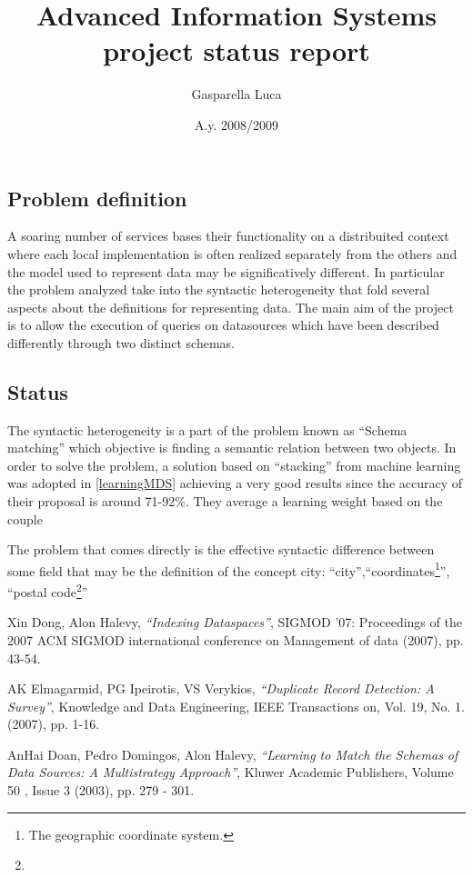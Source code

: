 \documentclass[12pt,a4paper]{article}
\title{Advanced Information Systems\\ project status report}
\author{Gasparella Luca}
\date{A.y. 2008/2009}
\begin{document}
\maketitle
\subsection*{Problem definition}
A soaring number of services bases their functionality on a distribuited context where each local implementation is often realized separately from the others and the model used to represent data may be significatively different. In particular the problem analyzed take into the syntactic heterogeneity that fold several aspects about the definitions for representing data. The main aim of the project is to allow the execution of queries on datasources which have been described differently through two distinct schemas.

\subsection*{Status}
The syntactic heterogeneity is a part of the problem known as ``Schema matching'' which objective is finding a semantic relation between two objects. In order to solve the problem, a solution based on ``stacking'' from machine learning was adopted in \ref{learningMDS} achieving a very good results since the accuracy of their proposal is around 71-92\%. They average a learning weight based on the couple 

The problem that comes directly is the effective syntactic difference between some field that may be the definition of the concept city: ``city'',``coordinates\footnote{The geographic coordinate system.}'', ``postal code\footnote{}''

\begin{thebibliography}{9}
 Xin Dong, Alon Halevy, \emph{``Indexing Dataspaces''}, SIGMOD '07: Proceedings of the 2007 ACM SIGMOD international conference on Management of data (2007), pp. 43-54.

 AK Elmagarmid, PG Ipeirotis, VS Verykios, \emph{``Duplicate Record Detection: A Survey''}, Knowledge and Data Engineering, IEEE Transactions on, Vol. 19, No. 1. (2007), pp. 1-16.

 AnHai Doan, Pedro Domingos, Alon Halevy, \emph{``Learning to Match the Schemas of Data Sources: A Multistrategy Approach''}, Kluwer Academic Publishers, Volume 50 ,  Issue 3 (2003), pp. 279 - 301.

\end{thebibliography}
\end{document}

